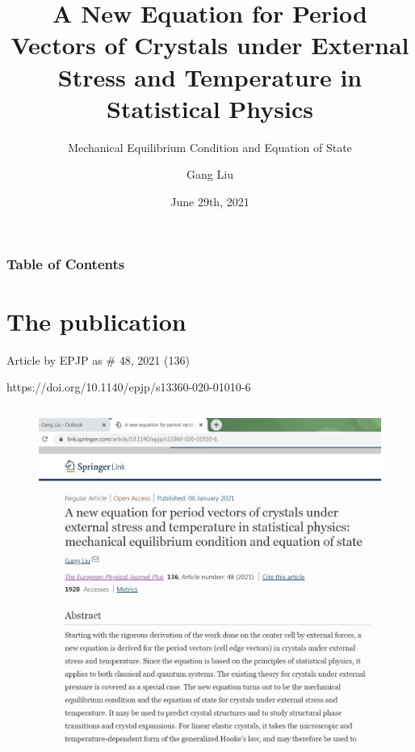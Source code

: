 \documentclass[8pt]{beamer}
\title{A New Equation for Period Vectors of Crystals under External Stress and Temperature in Statistical Physics}
\subtitle{ {\color{yellow} Mechanical Equilibrium Condition and Equation of State}}
\author{Gang Liu}
\institute
{ gl.cell@outlook.com \\
https://github.com/LiuGangKingston \\
http://www.linkedin.com/in/liuganglinkedin \\
https://doi.org/10.1140/epjp/s13360-020-01010-6 \\
Independent Researcher, Kingston, Ontario, Canada
}
\date {June 29th, 2021}
\begin{document}
\frame{\titlepage}

\begin{frame}
\frametitle{Table of Contents}
\tableofcontents
\end{frame}




\section{The publication}

\begin{frame}{Article by EPJP as \# 48, 2021 (136)}

{\centering \vspace{-.2cm} {https://doi.org/10.1140/epjp/s13360-020-01010-6} }

\begin{columns}
      \vspace{1cm} \hspace{.0cm}
      \begin{figure} 
          \includegraphics[width=1.\textwidth]{./w02.jpg}
      \end{figure} 
       

\end{columns}
\end{frame}
\end{document}
